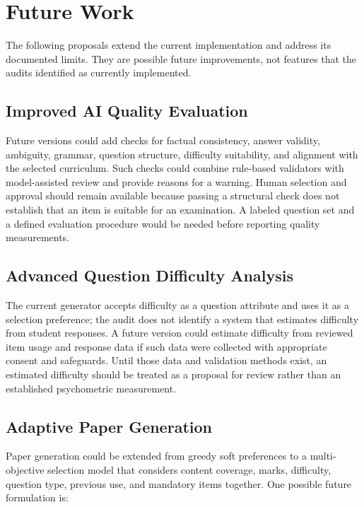 \section{Future Work}

The following proposals extend the current implementation and address its documented limits. They are possible future improvements, not features that the audits identified as currently implemented.

\subsection{Improved AI Quality Evaluation}

Future versions could add checks for factual consistency, answer validity, ambiguity, grammar, question structure, difficulty suitability, and alignment with the selected curriculum. Such checks could combine rule-based validators with model-assisted review and provide reasons for a warning. Human selection and approval should remain available because passing a structural check does not establish that an item is suitable for an examination. A labeled question set and a defined evaluation procedure would be needed before reporting quality measurements.

\subsection{Advanced Question Difficulty Analysis}

The current generator accepts difficulty as a question attribute and uses it as a selection preference; the audit does not identify a system that estimates difficulty from student responses. A future version could estimate difficulty from reviewed item usage and response data if such data were collected with appropriate consent and safeguards. Until those data and validation methods exist, an estimated difficulty should be treated as a proposal for review rather than an established psychometric measurement.

\subsection{Adaptive Paper Generation}

Paper generation could be extended from greedy soft preferences to a multi-objective selection model that considers content coverage, marks, difficulty, question type, previous use, and mandatory items together. One possible future formulation is:

